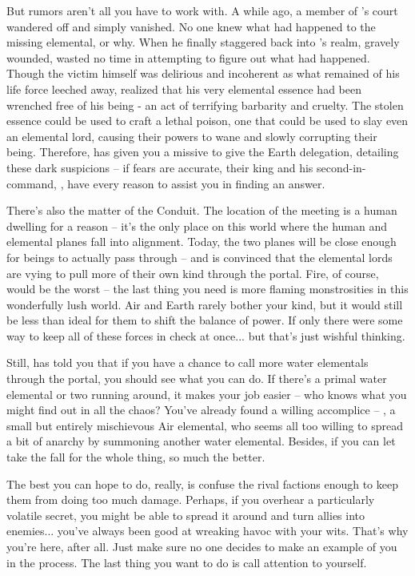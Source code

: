 \documentclass[char]{elementals}
\begin{document}
But rumors aren't all you have to work with. A while ago, a member of \cWaterQueen{}'s court wandered off and simply vanished. No one knew what had happened to the missing elemental, or why. When he finally staggered back into \cWaterQueen{}'s realm, gravely wounded, \cWaterQueen{\they} wasted no time in attempting to figure out what had happened. Though the victim himself was delirious and incoherent as what remained of his life force leeched away, \cWaterQueen{} realized that his very elemental essence had been wrenched free of his being - an act of terrifying barbarity and cruelty. The stolen essence could be used to craft a lethal poison, one that could be used to slay even an elemental lord, causing their powers to wane and slowly corrupting their being. Therefore, \cWaterQueen{} has given you a missive to give the Earth delegation, detailing these dark suspicions -- if \cWaterQueen{\their} fears are accurate, their king and his second-in-command, \cLoyal{\intro}, have every reason to assist you in finding an answer. 

There's also the matter of the Conduit. The location of the meeting is a human dwelling for a reason -- it's the only place on this world where the human and elemental planes fall into alignment. Today, the two planes will be close enough for beings to actually pass through -- and \cWaterQueen{} is convinced that the elemental lords are vying to pull more of their own kind through the portal. Fire, of course, would be the worst -- the last thing you need is more flaming monstrosities in this wonderfully lush world. Air and Earth rarely bother your kind, but it would still be less than ideal for them to shift the balance of power. If only there were some way to keep all of these forces in check at once... but that's just wishful thinking. 

Still, \cWaterQueen{} has told you that if you have a chance to call more water elementals through the portal, you should see what you can do. If there's a primal water elemental or two running around, it makes your job easier -- who knows what you might find out in all the chaos? You've already found a willing accomplice -- \cMiniAir{\intro}, a small but entirely mischievous Air elemental, who seems all too willing to spread a bit of anarchy by summoning another water elemental. Besides, if you can let \cMiniAir{\them} take the fall for the whole thing, so much the better.

The best you can hope to do, really, is confuse the rival factions enough to keep them from doing too much damage. Perhaps, if you overhear a particularly volatile secret, you might be able to spread it around and turn allies into enemies... you've always been good at wreaking havoc with your wits. That's why you're here, after all. Just make sure no one decides to make an example of you in the process. The last thing you want to do is call attention to yourself.
\end{document}
